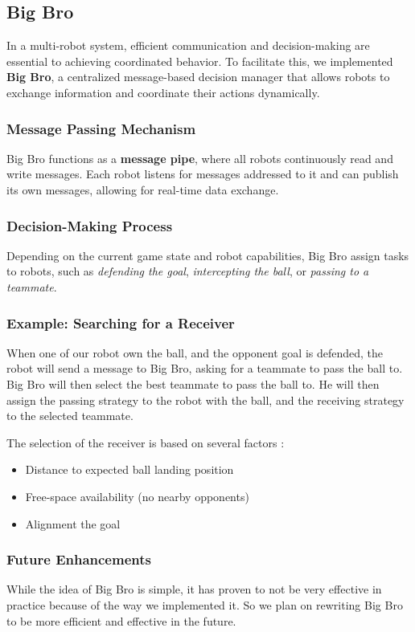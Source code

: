\subsection{Big Bro}

In a multi-robot system, efficient communication and decision-making are essential to achieving coordinated behavior. To facilitate this, we implemented \textbf{Big Bro}, a centralized message-based decision manager that allows robots to exchange information and coordinate their actions dynamically.  

\subsubsection{Message Passing Mechanism}

Big Bro functions as a \textbf{message pipe}, where all robots continuously read and write messages. Each robot listens for messages addressed to it and can publish its own messages, allowing for real-time data exchange.

\subsubsection{Decision-Making Process}

Depending on the current game state and robot capabilities, Big Bro assign tasks to robots, such as \textit{defending the goal}, \textit{intercepting the ball}, or \textit{passing to a teammate}.

\subsubsection{Example: Searching for a Receiver}

When one of our robot own the ball, and the opponent goal is defended, the robot will send a message to Big Bro, asking for a teammate to pass the ball to. Big Bro will then select the best teammate to pass the ball to. He will then assign the passing strategy to the robot with the ball, and the receiving strategy to the selected teammate.

The selection of the receiver is based on several factors :
\begin{itemize}
    \item Distance to expected ball landing position
    \item Free-space availability (no nearby opponents)
    \item Alignment the goal
\end{itemize}




\subsubsection{Future Enhancements}

While the idea of Big Bro is simple, it has proven to not be very effective in practice because of the way we implemented it. So we plan on rewriting Big Bro to be more efficient and effective in the future.